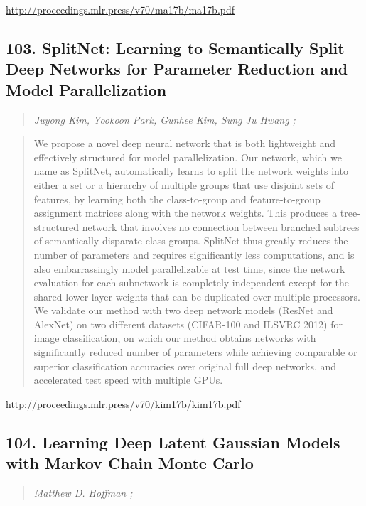 \documentclass{article}
\begin{document}
\href{http://proceedings.mlr.press/v70/ma17b/ma17b.pdf}{http://proceedings.mlr.press/v70/ma17b/ma17b.pdf}

\subsection{103. SplitNet: Learning to Semantically Split Deep Networks for Parameter Reduction and Model Parallelization}

\begin{quote}
\footnotesize{\textit{Juyong Kim, Yookoon Park, Gunhee Kim, Sung Ju Hwang ;}}
\end{quote}

\begin{quote}
    We propose a novel deep neural network that is both lightweight and effectively structured for model parallelization. Our network, which we name as SplitNet, automatically learns to split the network weights into either a set or a hierarchy of multiple groups that use disjoint sets of features, by learning both the class-to-group and feature-to-group assignment matrices along with the network weights. This produces a tree-structured network that involves no connection between branched subtrees of semantically disparate class groups. SplitNet thus greatly reduces the number of parameters and requires significantly less computations, and is also embarrassingly model parallelizable at test time, since the network evaluation for each subnetwork is completely independent except for the shared lower layer weights that can be duplicated over multiple processors. We validate our method with two deep network models (ResNet and AlexNet) on two different datasets (CIFAR-100 and ILSVRC 2012) for image classification, on which our method obtains networks with significantly reduced number of parameters while achieving comparable or superior classification accuracies over original full deep networks, and accelerated test speed with multiple GPUs.  \end{quote}

\href{http://proceedings.mlr.press/v70/kim17b/kim17b.pdf}{http://proceedings.mlr.press/v70/kim17b/kim17b.pdf}

\subsection{104. Learning Deep Latent Gaussian Models with Markov Chain Monte Carlo}

\begin{quote}
\footnotesize{\textit{Matthew D. Hoffman ;}}
\end{quote}
\end{document}
